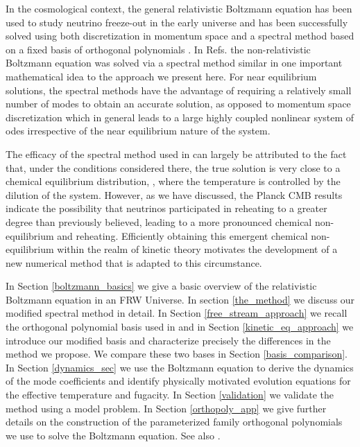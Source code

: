 In the cosmological context, the general relativistic Boltzmann equation has been used to study neutrino freeze-out in the early universe and has been successfully solved using both discretization in momentum space \cite{Madsen,Dolgov_Hansen,Gnedin,Mangano2005} and a spectral method based on a fixed basis of orthogonal polynomials \cite{Esposito2000,Mangano2002}.    In Refs.\cite{Wilkening,Wilkening2} the non-relativistic Boltzmann equation was solved via a spectral method similar in  one important mathematical idea to the approach we present here.  For near equilibrium solutions, the spectral methods have the advantage of requiring a relatively small number of modes to obtain an accurate solution, as opposed to momentum space discretization which in general leads to a large highly coupled nonlinear system of odes irrespective of the near equilibrium nature of the system.  

The efficacy of the spectral method used in \cite{Esposito2000,Mangano2002} can largely be attributed to the fact that, under the conditions considered there, the true solution is very close to a chemical equilibrium distribution, , where the temperature is controlled by the dilution of the system. However, as we have discussed, the Planck CMB results \cite{Planck} indicate the possibility that neutrinos participated in reheating to a greater degree than previously believed, leading to a more pronounced chemical non-equilibrium and reheating. Efficiently obtaining this emergent chemical non-equilibrium within the realm of kinetic theory motivates the development of a new numerical method that is adapted to this  circumstance.

In Section \ref{boltzmann_basics} we give a basic overview of the relativistic Boltzmann equation in an FRW Universe.  In section \ref{the_method} we discuss our modified spectral method in detail.  In Section \ref{free_stream_approach} we recall the orthogonal polynomial basis used in \cite{Esposito2000,Mangano2002} and in Section \ref{kinetic_eq_approach} we introduce our modified basis and characterize precisely the differences in the method  we propose. We compare these two bases in Section \ref{basis_comparison}. In Section \ref{dynamics_sec} we use the Boltzmann equation to derive the dynamics of the mode coefficients and identify physically motivated evolution equations for the effective temperature and fugacity.  In Section \ref{validation} we validate the method using a model problem.  In Section \ref{orthopoly_app} we give further details on the construction of the parameterized family orthogonal polynomials we use to solve the Boltzmann equation.  See also \cite{Birrell_orthopoly}.


